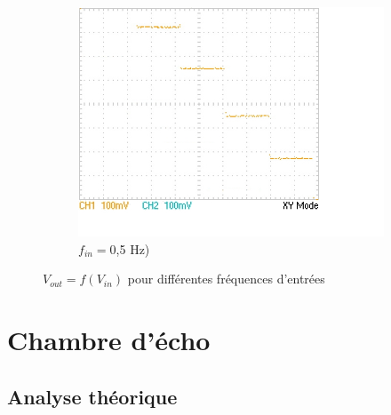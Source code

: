 \documentclass{article}
\begin{document}
\begin{figure}[h!]
\begin{subfigure}[b]{0.3\textwidth}
    \centering
    \includegraphics[width=\textwidth]{data/TEK0020_}
    \caption{$f_{in}=$0,5 Hz)}
    \label{fig:fastXY}
  \end{subfigure}
  \hfill  \caption{$V_{out}=f(V_{in})$ pour différentes fréquences d'entrées}
  \label{fig:slow}
\end{figure}




\section{Chambre d'écho}
\subsection{Analyse théorique}
\end{document}

